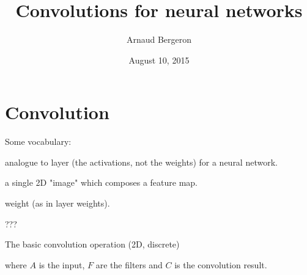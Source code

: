 \documentclass[utf8x,hyperref={pdfpagelabels=false}]{beamer}
\title{Convolutions for neural networks}
\author{%
Arnaud Bergeron
}
\date{August 10, 2015}
\begin{document}
\begin{frame}[plain]
 \titlepage
\end{frame}

\setcounter{page}{1}

\section{Convolution}

\begin{frame}
Some vocabulary:
\begin{description}
\item[feature map] analogue to layer (the activations, not the weights) for a neural network.
\item[channel] a single 2D "image" which composes a feature map.
\item[filter] weight (as in layer weights).
\item[stack] ???
\end{description}
\end{frame}

\begin{frame}
The basic convolution operation (2D, discrete)
\begin{overlayarea}{\textwidth}{5.6cm}
\end{overlayarea}
where $A$ is the input, $F$ are the filters and $C$ is the convolution result.
\end{frame}
\end{document}
